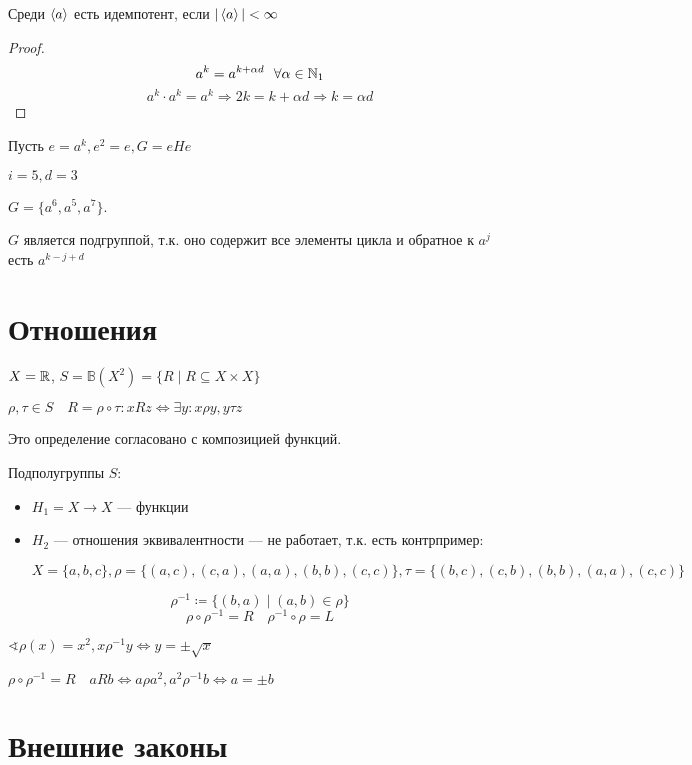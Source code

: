 \begin{statement}
    Среди \(\ev{a}\) есть идемпотент, если \(|\ev{a}| < \infty \)
\end{statement}
\begin{proof}
    \[a^k = a^{k + \alpha d} \ \ \forall \alpha \in \N_1\]
    \[a^k \cdot a^k = a^k \Rightarrow 2k = k + \alpha d \Rightarrow k = \alpha d\]
\end{proof}

Пусть \(e = a^k, e^2 = e, G = eHe\)

\begin{example}
    \(i = 5, d = 3\)

    \(G = \{a^6, a^5, a^7\}\).
\end{example}

\(G\) является подгруппой, т.к. оно содержит все элементы цикла и обратное к \(a^j\) есть \(a^{k - j + d}\)

\section*{Отношения}

\(X = \mathbb{R}\), \(S = \mathbb{B}(X^2) = \{R \mid R \subseteq X \times X\}\)

\(\rho, \tau \in S \quad R = \rho \circ \tau : x R z \Leftrightarrow \exists y : x \rho y, y \tau z\)

Это определение согласовано с композицией функций.

Подполугруппы \(S\):
\begin{itemize}
    \item \(H_1 = X \to X\) --- функции
    \item \(H_2\) --- отношения эквивалентности --- не работает, т.к. есть контрпример:

          \(X = \{a, b, c\}, \rho = \{(a, c), (c, a), (a, a), (b, b), (c, c)\}, \tau = \{(b, c), (c, b), (b, b), (a, a), (c, c)\}\)
\end{itemize}

\[\rho^{ - 1} \coloneqq \{(b, a) \mid (a, b) \in \rho\}\]
\[\rho \circ \rho^{ - 1} = R \quad \rho^{-1} \circ \rho = L\]

\(\sphericalangle \rho(x) = x^2, x\rho^{-1}y \Leftrightarrow y = \pm \sqrt{x}\)

\(\rho \circ \rho^{-1} = R \quad aRb \Leftrightarrow a\rho a^2, a^2\rho^{-1}b \Leftrightarrow a = \pm b\)

\section*{Внешние законы}

